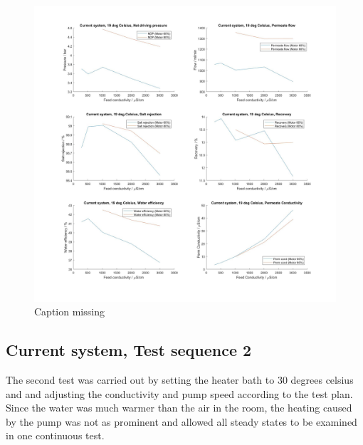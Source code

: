 \begin{figure}[H]
    \centering
    \includegraphics[width=1\textwidth]{Key20}
    \caption{Caption missing}
    \label{fig:K20}
\end{figure}

\newpage

\subsection{Current system, Test sequence 2}

The second test was carried out by setting the heater bath to 30 degrees celsius and and adjusting the conductivity and pump speed according to the test plan. Since the water was much warmer than the air in the room, the heating caused by the pump was not as prominent and allowed all steady states to be examined in one continuous test. 

